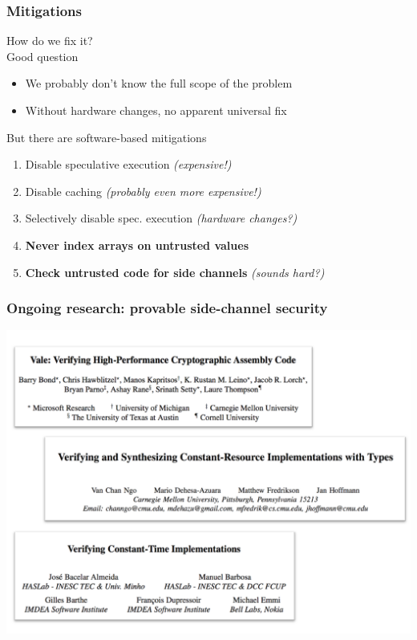 \documentclass[10pt,handout]{beamer}
\begin{document}

\begin{frame}

\frametitle{Mitigations}

How do we fix it?
\\[1em]

Good question
\begin{itemize}
\item We probably don't know the full scope of the problem
\item Without hardware changes, no apparent universal fix\\[1em]
\end{itemize}

But there are software-based mitigations
\begin{enumerate}
  \item Disable speculative execution \emph{(expensive!)}
  \item Disable caching \emph{(probably even more expensive!)}
  \item Selectively disable spec. execution \emph{(hardware changes?)}
  \item \textbf{Never index arrays on untrusted values}
  \pause \item \textbf{Check untrusted code for side channels} \pause \emph{(sounds hard?)}
\end{enumerate}

\end{frame}


\begin{frame}

\frametitle{Ongoing research: provable side-channel security}

\centering
\includegraphics[width=\textwidth]{sidechan-papers.pdf}

\end{frame}
\end{document}
